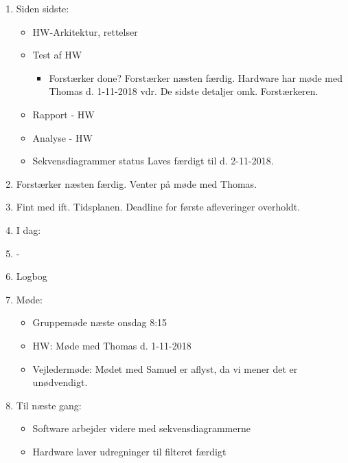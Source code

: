 \begin{enumerate}
	\item Siden sidste:
	\begin{itemize}
		\item HW-Arkitektur, rettelser
		\item Test af HW
		\begin{itemize}
			\item Forstærker done?
			Forstærker næsten færdig. Hardware har møde med Thomas d. 1-11-2018 vdr. De sidste detaljer omk. Forstærkeren.
		\end{itemize}
		\item Rapport - HW
		\item Analyse - HW
		\item Sekvensdiagrammer status
		Laves færdigt til d. 2-11-2018.
	\end{itemize}
	\item Forstærker næsten færdig. Venter på møde med Thomas.
	\item Fint med ift. Tidsplanen. Deadline for første afleveringer overholdt.
	\item I dag:
	\item -
	\item Logbog
	\item Møde:
	\begin{itemize}
		\item Gruppemøde næste onsdag 8:15
		\item HW: Møde med Thomas d. 1-11-2018
		\item Vejledermøde: Mødet med Samuel er aflyst, da vi mener det er unødvendigt.
	\end{itemize}
	\item Til næste gang:
	\begin{itemize}
		\item Software arbejder videre med sekvensdiagrammerne
		\item Hardware laver udregninger til filteret færdigt
	\end{itemize}
\end{enumerate}

\clearpage